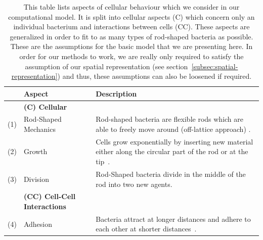 \documentclass{article}
\begin{document}
\begin{table}[H]
    \centering
    \def\arraystretch{1.3}
    \begin{tabularx}{\textwidth}{c l X}
        &\textbf{Aspect} & \textbf{Description}\\
        \toprule
        &\textbf{(C) Cellular}\\
        \midrule
        (1) & Rod-Shaped Mechanics &
            Rod-shaped bacteria are flexible rods which are able to freely move around (off-lattice
            approach) \cite{Takeuchi2005,Ursell2014,Amir2014_2}.\\
        (2) & Growth &
            Cells grow exponentially by inserting new material either along the circular part of the
            rod or at the tip~\cite{Robert2014,Takeuchi2005}.\\
        (3) & Division &
            Rod-Shaped bacteria divide in the middle of the rod into two new agents.\\
        &\textbf{(CC) Cell-Cell Interactions}\\
        \midrule
        (4) & Adhesion &
            Bacteria attract at longer distances and adhere to each other at shorter
            distances~\cite{Verwey1947,Trejo2013}.\\
        \bottomrule
    \end{tabularx}
    \caption{
        This table lists aspects of cellular behaviour which we consider in our computational model.
        It is split into cellular aspects (C) which concern only an individual bacterium and
        interactions between cells (CC).
        These aspects are generalized in order to fit to as many types of rod-shaped bacteria as
        possible.
        These are the assumptions for the basic model that we are presenting here.
        In order for our methods to work, we are really only required to satisfy the assumption of
        our spatial representation (see section~\ref{subsec:spatial-representation}) and thus, these
        assumptions can also be loosened if required.
    }
    \label{table:simulation-aspects}
\end{table}

\end{document}
